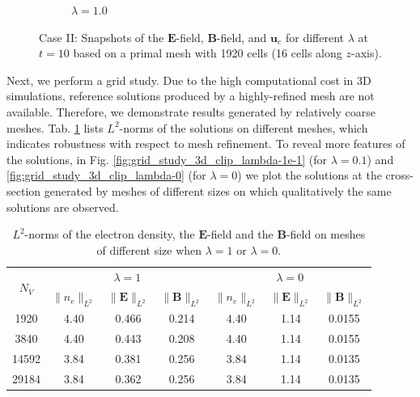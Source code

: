 \documentclass{article}
\begin{document}
\begin{figure}
\begin{subfigure}[b]{\textwidth}
        \caption{$\lambda = 1.0$}
    \end{subfigure}
    \caption{Case II: Snapshots of the $\mathbf{E}$-field, $\mathbf{B}$-field, and $\mathbf{u}_e$ for different $\lambda$ at $t = 10$ based on a primal mesh with 1920 cells (16 cells along $z$-axis). } 
    \label{fig:3d_vec_field_E_B_ue}
\end{figure}

Next, we perform a grid study. Due to the high computational cost in 3D simulations, reference solutions produced by a highly-refined mesh are not available. Therefore, we demonstrate results generated by relatively coarse meshes. Tab. \ref{tab:grid_study_norm} lists $L^2$-norms of the solutions on different meshes, which indicates robustness with respect to mesh refinement. To reveal more features of the solutions, in Fig. \ref{fig:grid_study_3d_clip_lambda-1e-1} (for $\lambda = 0.1$) and \ref{fig:grid_study_3d_clip_lambda-0} (for $\lambda = 0$) we plot the solutions at the cross-section generated by meshes of different sizes on which qualitatively the same solutions are observed.

\begin{table}[]
    \centering
    \begin{tabular}{c | c c c | c c c}
        \hline\hline
        \multirow{2}{1em}{$N_V$} & \multicolumn{3}{c}{$\lambda = 1$} & \multicolumn{3}{c}{$\lambda = 0$} \\
        \cline{2-4} \cline{5-7}
        & $\|n_e \|_{L^2}$ & $\|\mathbf{E} \|_{L^2}$ & $\|\mathbf{B} \|_{L^2}$ & $\|n_e \|_{L^2}$ & $\|\mathbf{E} \|_{L^2}$ & $\|\mathbf{B} \|_{L^2}$  \\
        \hline
         1920  &  4.40 & 0.466 & 0.214 & 4.40 & 1.14 & 0.0155 \\
         3840  &  4.40 & 0.443 & 0.208 & 4.40 & 1.14 & 0.0155 \\
         14592 &  3.84 & 0.381 & 0.256 & 3.84 & 1.14 & 0.0135 \\ 
         29184 &  3.84 & 0.362 & 0.256 & 3.84 & 1.14 & 0.0135 \\
         \hline\hline
    \end{tabular}
    \caption{$L^2$-norms of the electron density, the $\mathbf{E}$-field and the $\mathbf{B}$-field on meshes of different size when $\lambda = 1$ or $\lambda = 0$.}
    \label{tab:grid_study_norm}
\end{table}
\end{document}
